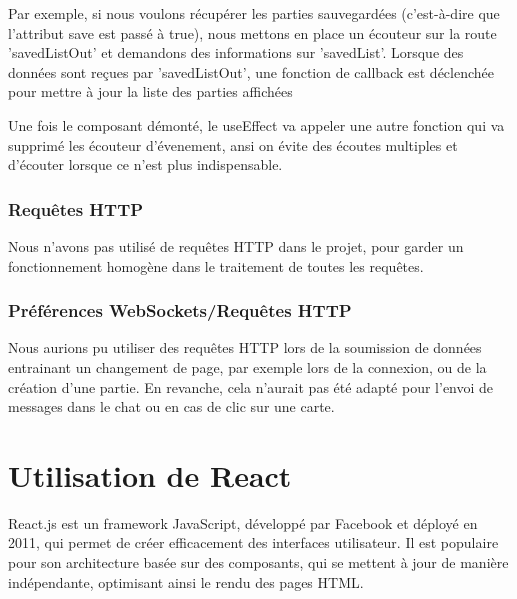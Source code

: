 \documentclass[a4paper]{article}
\begin{document}
\begin{itemize}
Par exemple, si nous voulons récupérer les parties sauvegardées (c'est-à-dire que l'attribut save est passé à true), nous mettons en place un écouteur sur la route 'savedListOut' et demandons des informations sur 'savedList'. Lorsque des données sont reçues par 'savedListOut', une fonction de callback est déclenchée pour mettre à jour la liste des parties affichées


Une fois le composant démonté, le useEffect va appeler une autre fonction qui va supprimé les écouteur d'évenement, ansi on évite des écoutes multiples et d'écouter lorsque ce n'est plus indispensable.


\end{itemize}
\subsubsection{Requêtes HTTP} Nous n'avons pas utilisé de requêtes HTTP dans le projet, pour garder un fonctionnement homogène dans le traitement de toutes les requêtes.
\subsubsection{Préférences WebSockets/Requêtes HTTP} Nous aurions pu utiliser des requêtes HTTP lors de la soumission de données entrainant un changement de page, par exemple lors de la connexion, ou de la création d'une partie. En revanche, cela n'aurait pas été adapté pour l'envoi de messages dans le chat ou en cas de clic sur une carte.


\section{Utilisation de React}





React.js est un framework JavaScript, développé par Facebook et déployé en 2011, qui permet de créer efficacement des interfaces utilisateur. Il est populaire pour son architecture basée sur des composants, qui se mettent à jour de manière indépendante, optimisant ainsi le rendu des pages HTML.
\end{document}
